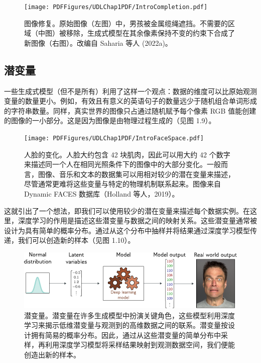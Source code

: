\documentclass[lang=cn,newtx,10pt,scheme=chinese]{elegantbook}
\begin{document}
\begin{figure}
	\centering
	\texttt{[image: PDFFigures/UDLChap1PDF/IntroCompletion.pdf]}
	\caption{图像修复。原始图像（左图）中，男孩被金属缆绳遮挡。不需要的区域（中图）被移除，生成式模型在其余像素保持不变的约束下合成了新图像（右图）。改编自 Saharia 等人 (2022a)。}
\end{figure}



\subsection{潜变量}
一些生成式模型（但不是所有）利用了这样一个观点：数据的维度可以比原始观测变量的数量更小。例如，有效且有意义的英语句子的数量远少于随机组合单词形成的字符串数量。同样，真实世界的图像只占通过随机赋予每个像素 RGB 值能创建的图像的一小部分。这是因为图像是由物理过程生成的（见图 1.9）。

\begin{figure}
	\centering
	\texttt{[image: PDFFigures/UDLChap1PDF/IntroFaceSpace.pdf]}
	\caption{人脸的变化。人脸大约包含 42 块肌肉，因此可以用大约 42 个数字来描述同一个人在相同光照条件下的图像中的大部分变化。一般而言，图像、音乐和文本的数据集可以用相对较少的潜在变量来描述，尽管通常更难将这些变量与特定的物理机制联系起来。图像来自 Dynamic FACES 数据库（Holland 等人，2019）。}
\end{figure}

这就引出了一个想法，即我们可以使用较少的潜在变量来描述每个数据实例。在这里，深度学习的作用是描述这些潜变量与数据之间的映射关系。这些潜变量通常被设计为具有简单的概率分布。通过从这个分布中抽样并将结果通过深度学习模型传递，我们可以创造新的样本（见图 1.10）。

\begin{figure}
	\centering
	\includegraphics[width=0.7\linewidth]{PDFFigures/UDLChap1PDF/IntroLatent.pdf}
	\caption{潜变量。潜变量在许多生成模型中扮演关键角色，这些模型利用深度学习来揭示低维潜变量与观测到的高维数据之间的联系。潜变量按设计拥有简易的概率分布。因此，通过从这些潜变量的简单分布中采样，再利用深度学习模型将采样结果映射到观测数据空间，我们便能创造出新的样本。}
\end{figure}
\end{document}
